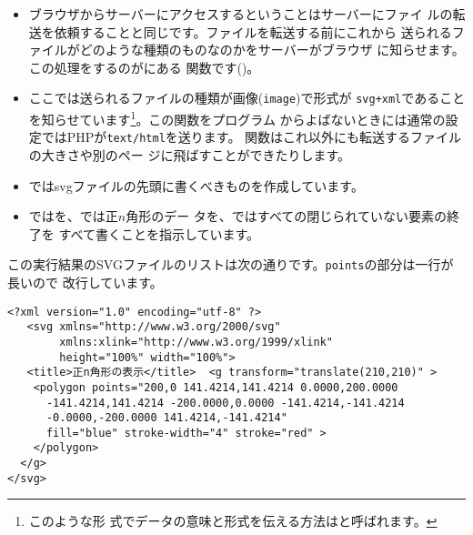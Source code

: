 \begin{itemize}
\begin{itemize}
       関数の戻り値は変換後の文字列です。\footnote{C言語で
	も\texttt{sprintf}関数は存在します。C言語の場合、
	\texttt{sprintf}関数の第1番目の引数に結果を格納する文字の配列を
	指定します。}

 \item {}からで先ほど定義した
       \texttt{outputTag}関数を用いてを出力します。ここでは
       引数を2つしか与えていないのでこの要素はこの時点で閉じられていま
       せん。
 \item この関数の2番目の引数は属性名をキーに値を属性値にとる連想配列の形
       です。このために関数で配列を作成しています。
\end{itemize}
 \item ブラウザからサーバーにアクセスするということはサーバーにファイ
       ルの転送を依頼することと同じです。ファイルを転送する前にこれから
       送られるファイルがどのような種類のものなのかをサーバーがブラウザ
       に知らせます。この処理をするのがにある
       関数です()。 
 \item ここでは送られるファイルの種類が画像(\texttt{image})で形式が
       \texttt{svg+xml}であることを知らせています\footnote{このような形
       式でデータの意味と形式を伝える方法はと呼ばれます。}。この関数をプログラム
       からよばないときには通常の設定ではPHPが\texttt{text/html}を送ります。
       関数はこれ以外にも転送するファイルの大きさや別のペー
       ジに飛ばすことができたりします。
 \item {}ではsvgファイルの先頭に書くべきものを作成しています。
 \item {}ではを、では正$n$角形のデー
       タを、ではすべての閉じられていない要素の終了を
       すべて書くことを指示しています。
\end{itemize}
この実行結果のSVGファイルのリストは次の通りです。\texttt{points}の部分は一行が長いので
改行しています。
\begin{verbatim}
<?xml version="1.0" encoding="utf-8" ?>
   <svg xmlns="http://www.w3.org/2000/svg"
        xmlns:xlink="http://www.w3.org/1999/xlink"
        height="100%" width="100%">
   <title>正n角形の表示</title>  <g transform="translate(210,210)" >
    <polygon points="200,0 141.4214,141.4214 0.0000,200.0000
      -141.4214,141.4214 -200.0000,0.0000 -141.4214,-141.4214
      -0.0000,-200.0000 141.4214,-141.4214" 
      fill="blue" stroke-width="4" stroke="red" >
    </polygon>
  </g>
</svg>
\end{verbatim}
